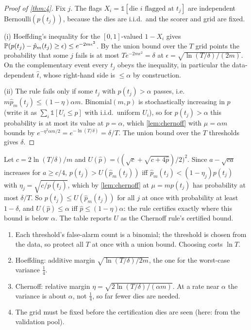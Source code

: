 \begin{proof}[Proof of \cref{thm:4}]
Fix $j$. The flags $X_i=\mathbb 1[\text{die }i\text{ flagged at }t_j]$ are independent
Bernoulli$(p(t_j))$, because the dies are i.i.d.\ and the scorer and grid are fixed.

(i) Hoeffding's inequality \citep{hoeffding1963probability} for the $[0,1]$-valued $1-X_i$ gives
$\P(p(t_j)-\hat p_m(t_j)\ge\epsilon)\le e^{-2m\epsilon^2}$. By the union bound over the $T$ grid points
the probability that some $j$ fails is at most $Te^{-2m\epsilon^2}=\delta$ at
$\epsilon=\sqrt{\ln(T/\delta)/(2m)}$. On the complementary event every $t_j$ obeys the inequality,
in particular the data-dependent $\hat t$, whose right-hand side is $\le\alpha$ by construction.

(ii) The rule fails only if some $t_j$ with $p(t_j)>\alpha$ passes, i.e.\
$m\hat p_m(t_j)\le(1-\eta)\alpha m$. Binomial$(m,p)$ is stochastically increasing in $p$ (write it as
$\sum_i\mathbb 1[U_i\le p]$ with i.i.d.\ uniform $U_i$), so for $p(t_j)>\alpha$ this probability is at most
its value at $p=\alpha$, which \cref{lem:chernoff} with $\mu=\alpha m$ bounds by
$e^{-\eta^2\alpha m/2}=e^{-\ln(T/\delta)}=\delta/T$. The union bound over the $T$ thresholds gives $\delta$.
\end{proof}

\begin{remark}
Let $c=2\ln(T/\delta)/m$ and $U(\hat p)=\bigl((\sqrt c+\sqrt{c+4\hat p})/2\bigr)^2$. Since $a-\sqrt{ca}$
increases for $a\ge c/4$, $p(t_j)>U(\hat p_m(t_j))$ iff $\hat p_m(t_j)<(1-\eta_j)p(t_j)$ with
$\eta_j=\sqrt{c/p(t_j)}$, which by \cref{lem:chernoff} at $\mu=mp(t_j)$ has probability at most $\delta/T$.
So $p(t_j)\le U(\hat p_m(t_j))$ for all $j$ at once with probability at least $1-\delta$, and
$U(\hat p)\le\alpha$ iff $\hat p\le(1-\eta)\alpha$: the rule certifies exactly where this bound is below
$\alpha$. The table reports $U$ as the Chernoff rule's certified bound.
\end{remark}

\begin{inshort}
\begin{enumerate}[leftmargin=*]
  \item Each threshold's false-alarm count is a binomial; the threshold is chosen from the data,
    so protect all $T$ at once with a union bound. Choosing costs $\ln T$.
  \item Hoeffding: additive margin $\sqrt{\ln(T/\delta)/2m}$, the one for the worst-case variance $\frac14$.
  \item Chernoff: relative margin $\eta=\sqrt{2\ln(T/\delta)/(\alpha m)}$. At a rate near $\alpha$ the
    variance is about $\alpha$, not $\frac14$, so far fewer dies are needed.
  \item The grid must be fixed before the certification dies are seen (here: from the validation pool).
\end{enumerate}
\end{inshort}

